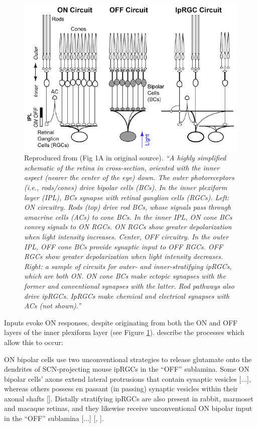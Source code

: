 \begin{figure}[htbp]
\includegraphics[max width=\textwidth, center]{figs/LitRev/do.png}
\caption{Reproduced from \citet{do_melanopsin_2019} (Fig 1A in original source). \textit{``A highly simplified schematic of the retina in cross-section, oriented with the inner aspect (nearer the center of the eye) down. The outer photoreceptors (i.e., rods/cones) drive bipolar cells (BCs). In the inner plexiform layer (IPL), BCs synapse with retinal ganglion cells (RGCs). Left: ON circuitry. Rods (top) drive rod BCs, whose signals pass through amacrine cells (ACs) to cone BCs. In the inner IPL, ON cone BCs convey signals to ON RGCs. ON RGCs show greater depolarization when light intensity increases. Center, OFF circuitry. In the outer IPL, OFF cone BCs provide synaptic input to OFF RGCs. OFF RGCs show greater depolarization when light intensity decreases. Right: a sample of circuits for outer- and inner-stratifying ipRGCs, which are both ON. ON cone BCs make ectopic synapses with the former and conventional synapses with the latter. Rod pathways also drive ipRGCs. IpRGCs make chemical and electrical synapses with ACs (not shown).''}}
\label{fig:do}
\end{figure}

Inputs evoke ON responses, despite originating from both the ON and OFF layers of the inner plexiform layer (see Figure \ref{fig:do}). \citet{graham_melanopsin-expressing_2016} describe the processes which allow this to occur: 

\begin{itquote}{}
ON bipolar cells use two unconventional strategies to release glutamate onto the dendrites of SCN-projecting mouse ipRGCs in the ``OFF'' sublamina. Some ON bipolar cells' axons extend lateral protrusions that contain synaptic vesicles [...], whereas others possess en passant (in passing) synaptic vesicles within their axonal shafts [\citet{dumitrescu_ectopic_2009}]. Distally stratifying ipRGCs are also present in rabbit, marmoset and macaque retinas, and they likewise receive unconventional ON bipolar input in the ``OFF'' sublamina [...] [\citet{hoshi_inputs_2009}, \citet{grunert_bipolar_2011}].
\end{itquote}

